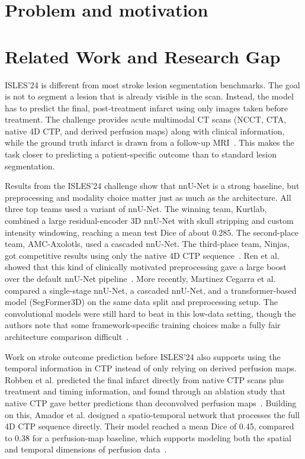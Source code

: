 \begin{abstract}

\end{abstract}

\section{Problem and motivation}


\section{Related Work and Research Gap}
\label{rel}

ISLES'24 is different from most stroke lesion segmentation benchmarks. The goal is not to segment a lesion that is already visible in the scan. Instead, the model has to predict the final, post-treatment infarct using only images taken before treatment. The challenge provides acute multimodal CT scans (NCCT, CTA, native 4D CTP, and derived perfusion maps) along with clinical information, while the ground truth infarct is drawn from a follow-up MRI~\cite{delarosa2024isles24,riedel2026isles24dataset}. This makes the task closer to predicting a patient-specific outcome than to standard lesion segmentation.

Results from the ISLES'24 challenge show that nnU-Net is a strong baseline, but preprocessing and modality choice matter just as much as the architecture. All three top teams used a variant of nnU-Net. The winning team, Kurtlab, combined a large residual-encoder 3D nnU-Net with skull stripping and custom intensity windowing, reaching a mean test Dice of about 0.285. The second-place team, AMC-Axolotls, used a cascaded nnU-Net. The third-place team, Ninjas, got competitive results using only the native 4D CTP sequence~\cite{delarosa2024isles24,ren2025isles24}. Ren et al. showed that this kind of clinically motivated preprocessing gave a large boost over the default nnU-Net pipeline~\cite{ren2025isles24}. More recently, Martinez Cegarra et al. compared a single-stage nnU-Net, a cascaded nnU-Net, and a transformer-based model (SegFormer3D) on the same data split and preprocessing setup. The convolutional models were still hard to beat in this low-data setting, though the authors note that some framework-specific training choices make a fully fair architecture comparison difficult~\cite{cegarra2026isles}.

Work on stroke outcome prediction before ISLES'24 also supports using the temporal information in CTP instead of only relying on derived perfusion maps. Robben et al. predicted the final infarct directly from native CTP scans plus treatment and timing information, and found through an ablation study that native CTP gave better predictions than deconvolved perfusion maps~\cite{robben2020nativectp}. Building on this, Amador et al. designed a spatio-temporal network that processes the full 4D CTP sequence directly. Their model reached a mean Dice of 0.45, compared to 0.38 for a perfusion-map baseline, which supports modeling both the spatial and temporal dimensions of perfusion data~\cite{amador2022spatiotemporal}.


